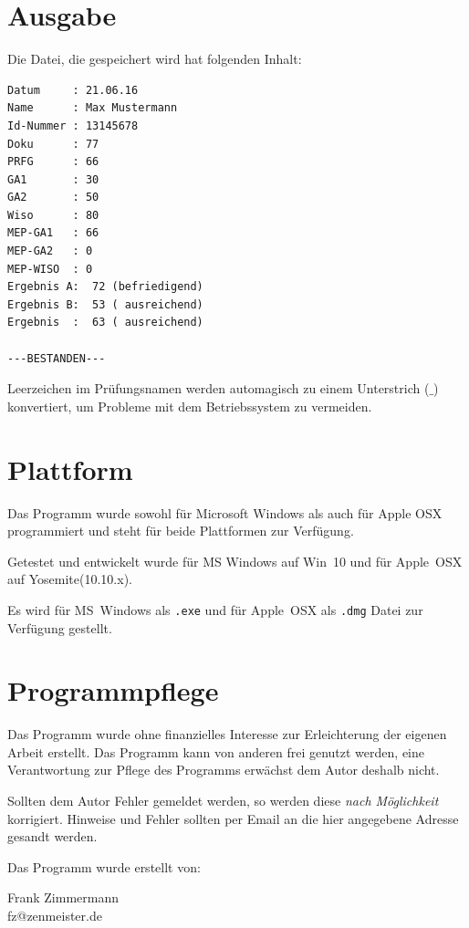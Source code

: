 \documentclass[a4paper,notitlepage,parskip=half]{scrartcl}
\newcommand{\cfile}[1]{{\texttt{#1}}}
\begin{document}
\section{Ausgabe}
Die Datei, die gespeichert wird hat folgenden Inhalt:
\nopagebreak[4]

\begin{minipage}[t]{\textwidth}
\begin{lstlisting}[numbers=none,caption={\cfile{Gesicherte Datei: $20160621Max\_Mustermann13145678.txt$}},label=lst:datei]
Datum     : 21.06.16
Name      : Max Mustermann
Id-Nummer : 13145678
Doku      : 77
PRFG      : 66
GA1       : 30
GA2       : 50
Wiso      : 80
MEP-GA1   : 66
MEP-GA2   : 0
MEP-WISO  : 0
Ergebnis A:  72 (befriedigend)
Ergebnis B:  53 ( ausreichend)
Ergebnis  :  63 ( ausreichend)

---BESTANDEN---
\end{lstlisting}
\end{minipage}
Leerzeichen im Prüfungsnamen werden automagisch zu einem Unterstrich ($\_$) konvertiert, um Probleme mit dem Betriebssystem zu vermeiden.

\section{Plattform}
Das Programm wurde sowohl für Microsoft Windows als auch für Apple OSX programmiert und steht für beide Plattformen zur Verfügung.

Getestet und entwickelt wurde für MS Windows auf Win~10 und für Apple~OSX auf Yosemite(10.10.x).

Es wird für MS~Windows als \texttt{.exe} und für Apple~OSX als \texttt{.dmg} Datei zur Verfügung gestellt. 

\section{Programmpflege}
Das Programm wurde ohne finanzielles Interesse zur Erleichterung der eigenen Arbeit erstellt.
Das Programm kann von anderen frei genutzt werden, eine Verantwortung zur Pflege des Programms erwächst dem Autor deshalb nicht.

Sollten dem Autor Fehler gemeldet werden, so werden diese \emph{nach Möglichkeit} korrigiert. Hinweise und Fehler sollten per Email an die hier angegebene Adresse gesandt werden.

Das Programm wurde erstellt von:

Frank Zimmermann\\
fz@zenmeister.de
\end{document}
